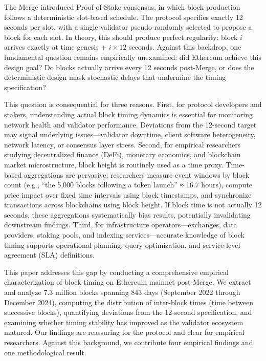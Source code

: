 \documentclass[12pt]{article}
\begin{document}
The Merge introduced Proof-of-Stake consensus, in which block production follows a deterministic slot-based schedule. The protocol specifies exactly 12 seconds per slot, with a single validator pseudo-randomly selected to propose a block for each slot. In theory, this should produce perfect regularity: block $i$ arrives exactly at time genesis + $i \times 12$ seconds. Against this backdrop, one fundamental question remains empirically unexamined: did Ethereum achieve this design goal? Do blocks actually arrive every 12 seconds post-Merge, or does the deterministic design mask stochastic delays that undermine the timing specification?

This question is consequential for three reasons. First, for protocol developers and stakers, understanding actual block timing dynamics is essential for monitoring network health and validator performance. Deviations from the 12-second target may signal underlying issues—validator downtime, client software heterogeneity, network latency, or consensus layer stress. Second, for empirical researchers studying decentralized finance (DeFi), monetary economics, and blockchain market microstructure, block height is routinely used as a time proxy. Time-based aggregations are pervasive: researchers measure event windows by block count (e.g., ``the 5,000 blocks following a token launch'' ≈ 16.7 hours), compute price impact over fixed time intervals using block timestamps, and synchronize transactions across blockchains using block height. If block time is not actually 12 seconds, these aggregations systematically bias results, potentially invalidating downstream findings. Third, for infrastructure operators—exchanges, data providers, staking pools, and indexing services—accurate knowledge of block timing supports operational planning, query optimization, and service level agreement (SLA) definitions.

This paper addresses this gap by conducting a comprehensive empirical characterization of block timing on Ethereum mainnet post-Merge. We extract and analyze 7.3 million blocks spanning 843 days (September 2022 through December 2024), computing the distribution of inter-block times (time between successive blocks), quantifying deviations from the 12-second specification, and examining whether timing stability has improved as the validator ecosystem matured. Our findings are reassuring for the protocol and clear for empirical researchers. Against this background, we contribute four empirical findings and one methodological result.
\end{document}
